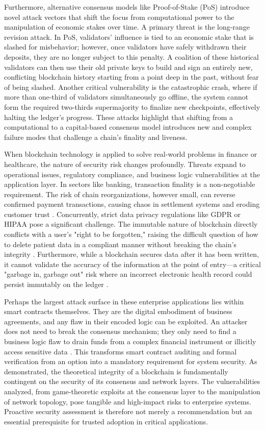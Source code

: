 Furthermore, alternative consensus models like Proof-of-Stake (PoS) introduce novel attack vectors that shift the focus from computational power to the manipulation of economic stakes over time. A primary threat is the long-range revision attack. In PoS, validators' influence is tied to an economic stake that is slashed for misbehavior; however, once validators have safely withdrawn their deposits, they are no longer subject to this penalty. A coalition of these historical validators can then use their old private keys to build and sign an entirely new, conflicting blockchain history starting from a point deep in the past, without fear of being slashed. Another critical vulnerability is the catastrophic crash, where if more than one-third of validators simultaneously go offline, the system cannot form the required two-thirds supermajority to finalize new checkpoints, effectively halting the ledger's progress. These attacks highlight that shifting from a computational to a capital-based consensus model introduces new and complex failure modes that challenge a chain's finality and liveness.

When blockchain technology is applied to solve real-world problems in finance or healthcare, the nature of security risk changes profoundly. Threats expand to operational issues, regulatory compliance, and business logic vulnerabilities at the application layer. In sectors like banking, transaction finality is a non-negotiable requirement. The risk of chain reorganizations, however small, can reverse confirmed payment transactions, causing chaos in settlement systems and eroding customer trust \cite{Casino2019}. Concurrently, strict data privacy regulations like GDPR or HIPAA pose a significant challenge. The immutable nature of blockchain directly conflicts with a user's "right to be forgotten," raising the difficult question of how to delete patient data in a compliant manner without breaking the chain's integrity \cite{DeAguiar2022}. Furthermore, while a blockchain secures data after it has been written, it cannot validate the accuracy of the information at the point of entry—a critical "garbage in, garbage out" risk where an incorrect electronic health record could persist immutably on the ledger \cite{DeAguiar2022}.

Perhaps the largest attack surface in these enterprise applications lies within smart contracts themselves. They are the digital embodiment of business agreements, and any flaw in their encoded logic can be exploited. An attacker does not need to break the consensus mechanism; they only need to find a business logic flaw to drain funds from a complex financial instrument or illicitly access sensitive data \cite{Khan2022}. This transforms smart contract auditing and formal verification from an option into a mandatory requirement for system security. As demonstrated, the theoretical integrity of a blockchain is fundamentally contingent on the security of its consensus and network layers. The vulnerabilities analyzed, from game-theoretic exploits at the consensus layer to the manipulation of network topology, pose tangible and high-impact risks to enterprise systems. Proactive security assessment is therefore not merely a recommendation but an essential prerequisite for trusted adoption in critical applications.